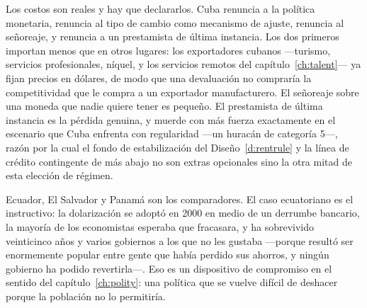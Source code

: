 Los costos son reales y hay que declararlos. Cuba renuncia a la política monetaria,
renuncia al tipo de cambio como mecanismo de ajuste, renuncia al señoreaje, y renuncia
a un prestamista de última instancia. Los dos primeros importan menos que en otros
lugares: los exportadores cubanos ---turismo, servicios profesionales, níquel, y los
servicios remotos del capítulo~\ref{ch:talent}--- ya fijan precios en dólares, de modo
que una devaluación no compraría la competitividad que le compra a un exportador
manufacturero. El señoreaje sobre una moneda que nadie quiere tener es pequeño. El
prestamista de última instancia es la pérdida genuina, y muerde con más fuerza
exactamente en el escenario que Cuba enfrenta con regularidad ---un huracán de
categoría 5---, razón por la cual el fondo de estabilización del
Diseño~\ref{d:rentrule} y la línea de crédito contingente de más abajo no son extras
opcionales sino la otra mitad de esta elección de régimen.

Ecuador, El Salvador y Panamá son los comparadores. El caso ecuatoriano es el
instructivo: la dolarización se adoptó en 2000 en medio de un derrumbe bancario, la
mayoría de los economistas esperaba que fracasara, y ha sobrevivido veinticinco años y
varios gobiernos a los que no les gustaba ---porque resultó ser enormemente popular
entre gente que había perdido sus ahorros, y ningún gobierno ha podido revertirla---.
Eso es un dispositivo de compromiso en el sentido del capítulo~\ref{ch:polity}: una
política que se vuelve difícil de deshacer porque la población no lo permitiría.

